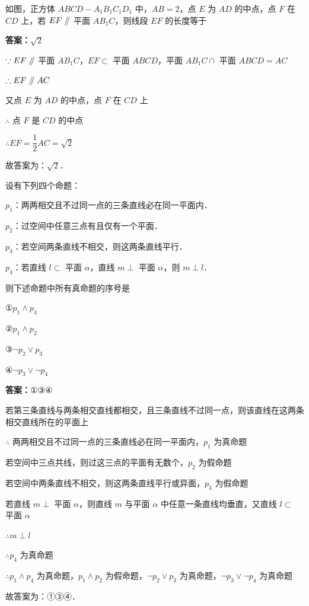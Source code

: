 \vspace{2em}
\begin{example}[\bkstar{2}{5}]
如图，正方体 $ABCD-A_1B_1C_1D_1$ 中，$AB=2$，点 $E$ 为 $AD$ 的中点，点 $F$ 在 $CD$ 上，若 $EF\mathrel{/\mkern-5mu/}$ 平面 $AB_1C$，则线段 $EF$ 的长度等于
\end{example}
\begin{solution}
\textbf{答案：}$\sqrt{2}$

$\because EF\mathrel{/\mkern-5mu/}$ 平面 $AB_1C$，$EF\subset$ 平面 $ABCD$，平面 $AB_1C\cap$ 平面 $ABCD=AC$

$\therefore EF\mathrel{/\mkern-5mu/} AC$

又点 $E$ 为 $AD$ 的中点，点 $F$ 在 $CD$ 上

$\therefore$ 点 $F$ 是 $CD$ 的中点

$\therefore EF=\dfrac{1}{2}AC=\sqrt{2}$

故答案为：$\sqrt{2}$．
\end{solution}

\vspace{2em}

\begin{example}[\bkstar{2}{5}]
设有下列四个命题：

$p_1$：两两相交且不过同一点的三条直线必在同一平面内．

$p_2$：过空间中任意三点有且仅有一个平面．

$p_3$：若空间两条直线不相交，则这两条直线平行．

$p_4$：若直线 $l\subset$ 平面 $\alpha$，直线 $m\perp$ 平面 $\alpha$，则 $m\perp l$．

则下述命题中所有真命题的序号是

①$p_1\wedge p_4$

②$p_1\wedge p_2$

③$\neg p_2\vee p_3$

④$\neg p_3\vee\neg p_4$
\end{example}
\begin{solution}
\textbf{答案：}①③④

若第三条直线与两条相交直线都相交，且三条直线不过同一点，则该直线在这两条相交直线所在的平面上

$\therefore$ 两两相交且不过同一点的三条直线必在同一平面内，$p_1$ 为真命题

若空间中三点共线，则过这三点的平面有无数个，$p_2$ 为假命题

若空间中两条直线不相交，则这两条直线平行或异面，$p_3$ 为假命题

若直线 $m\perp$ 平面 $\alpha$，则直线 $m$ 与平面 $\alpha$ 中任意一条直线均垂直，又直线 $l\subset$ 平面 $\alpha$

$\therefore m\perp l$

$\therefore p_4$ 为真命题

$\therefore p_1\wedge p_4$ 为真命题，$p_1\wedge p_2$ 为假命题，$\neg p_2\vee p_3$ 为真命题，$\neg p_3\vee\neg p_4$ 为真命题

故答案为：①③④．
\end{solution}

